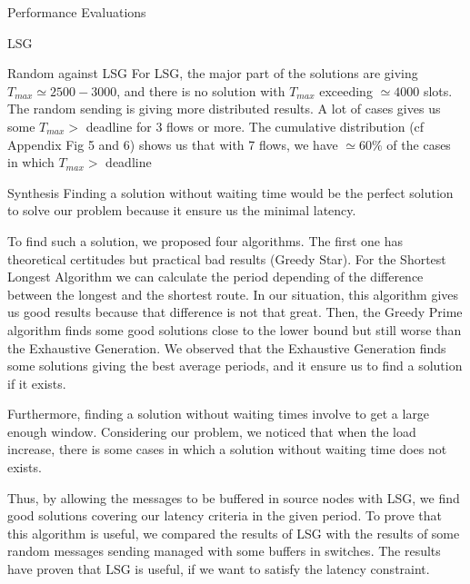 \documentclass[a4paper,10pt]{report}
\begin{document}
\begin{chapter}{Performance Evaluations}
\begin{section}{LSG}
\begin{subsection}{Random against LSG}
For LSG, the major part of the solutions are giving $T_{max} \simeq 2500-3000$, and there is no
solution with $T_{max}$ exceeding $\simeq 4000$ slots.
The random sending is giving more distributed results. A lot of cases gives us some $T_{max} >$ deadline for 3 flows or more.
The cumulative distribution (cf Appendix Fig 5 and 6) shows us that with 7 flows, we have $\simeq 60\%$ of the cases in which $T_{max} >$ deadline


\end{subsection}

\end{section}

\begin{section}{Synthesis}
Finding a solution without waiting time would be the perfect solution to solve our problem because it ensure us the minimal latency.

To find such a solution, we proposed four algorithms. The first one has theoretical certitudes but practical bad results (Greedy Star).
For the Shortest Longest Algorithm we can calculate the period depending of the difference between the longest and the shortest route.
In our situation, this algorithm gives us good results because that difference is not that great.
Then, the Greedy Prime algorithm finds some good solutions close to the lower bound but still worse than the Exhaustive Generation.
We observed that the Exhaustive Generation finds some solutions giving the best average periods, and it ensure us to find a solution if it exists.

Furthermore, finding a solution without waiting times involve to get a large enough window. Considering our problem, we noticed that when the 
load increase, there is some cases in which a solution without waiting time does not exists.

Thus, by allowing the messages to be buffered in source nodes with LSG, we find good solutions covering our latency 
criteria in the given period. To prove that this algorithm is useful, we compared the results of LSG with the results of some
random messages sending managed with some buffers in switches. The results have proven that LSG is useful, if we want
to satisfy the latency constraint.

\end{section}

\end{chapter}
\end{document}
